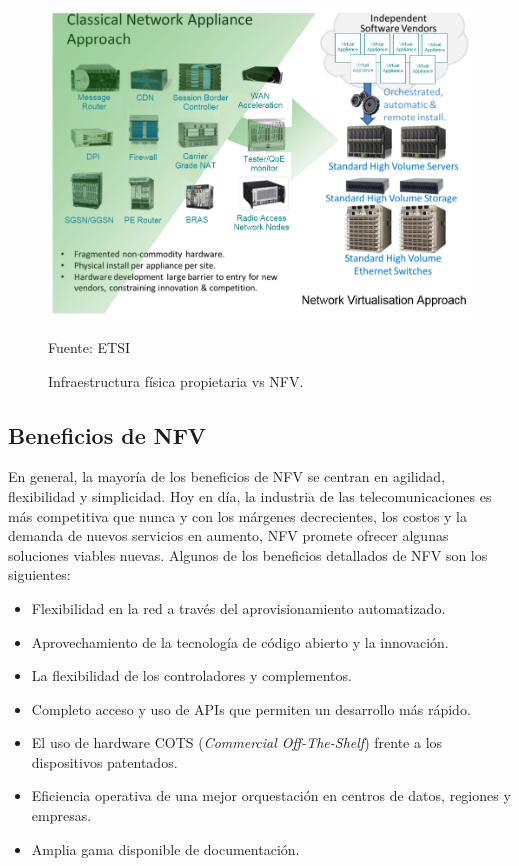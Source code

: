 \begin{figure}[!ht]  \centering
    \includegraphics[width=1\textwidth]{imagenes/capitulo1/clasicovsnfv.png}
    \caption{Infraestructura física propietaria vs NFV.}
	\vspace{0.3cm}
    \footnotesize{Fuente: ETSI}
    \label{clasicovsnfv}
\end{figure}

\subsection{Beneficios de NFV}
En general, la mayoría de los beneficios de NFV se centran en agilidad, flexibilidad y simplicidad. Hoy en día, la industria de las telecomunicaciones es más competitiva que nunca y con los márgenes decrecientes, los costos y la demanda de nuevos servicios en aumento, NFV promete ofrecer algunas soluciones viables nuevas. Algunos de los beneficios detallados de NFV son los siguientes:


\begin{itemize}
\item Flexibilidad en la red a través del aprovisionamiento automatizado.
\item Aprovechamiento de la tecnología de código abierto y la innovación.
\item La flexibilidad de los controladores y complementos.
\item Completo acceso y uso de APIs que permiten un desarrollo más rápido.
\item El uso de hardware COTS (\textit{Commercial Off-The-Shelf}) frente a los dispositivos patentados.
\item Eficiencia operativa de una mejor orquestación en centros de datos, regiones y empresas.
\item Amplia gama disponible de documentación.
\end{itemize}

